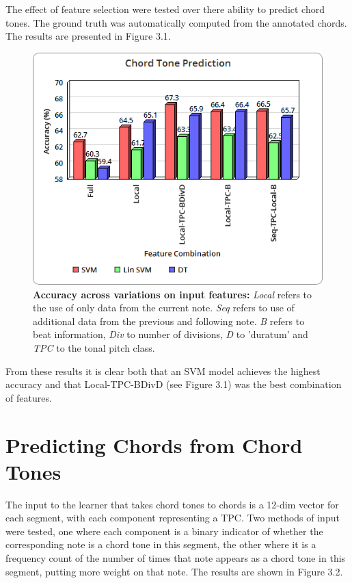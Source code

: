 \documentclass[bsc,singlespacing,parskip,deptreport]{infthesis}
\begin{document}
The effect of feature selection were tested over there ability to predict chord tones. The ground truth was automatically computed from the annotated chords. The results are presented in Figure 3.1. 

\begin{figure}
  \caption{\textbf{Accuracy across variations on input features:} \emph{Local} refers to the use of only data from the current note. \emph{Seq} refers to use of additional data from the previous and following note. \emph{B} refers to beat information, \emph{Div} to number of divisions, \emph{D} to 'duratum' and \emph{TPC} to the tonal pitch class.}
  \centering
    \includegraphics[scale=0.5]{ct1}
\end{figure}

From these results it is clear both that an SVM model achieves the highest accuracy and that Local-TPC-BDivD (see Figure 3.1) was the best combination of features.

\section{Predicting Chords from Chord Tones}

The input to the learner that takes chord tones to chords is a 12-dim vector for each segment, with each component representing a TPC. Two methods of input were tested, one where each component is a binary indicator of whether the corresponding note is a chord tone in this segment, the other where it is a frequency count of the number of times that note appears as a chord tone in this segment, putting more weight on that note. The results are shown in Figure 3.2.
\end{document}
